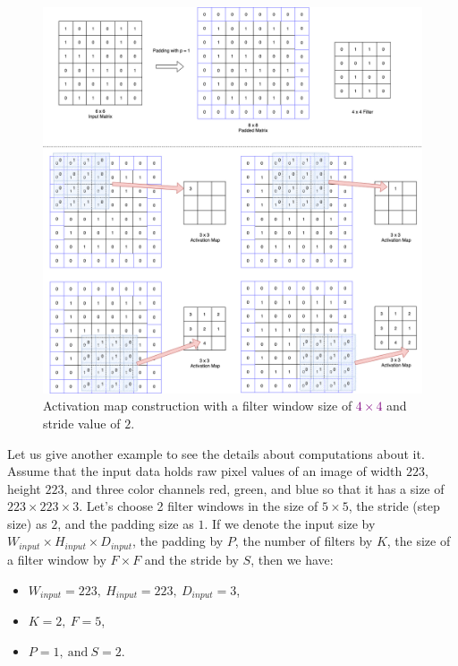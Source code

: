 \begin{figure}[!h]
	\centering
	\includegraphics[width=\linewidth]{fig/conv_layer.png}
	\vspace*{2mm}
	\caption{Activation map construction with a filter window size of  \textcolor{purple}{$4 \times 4$} and stride value of $2$.}
	\label{conv_layer}
\end{figure}

Let us give another example to see the details about computations about it. Assume that the input data 
holds raw pixel values of an image of width $223$, height $223$, and three color channels red, green, and blue so that it has a size of $223 \times 223 \times 3$. Let's choose 2 filter windows in the size of $5 \times 5$, the stride (step size) as $2$, and the padding size as $1$. If we denote the input size by $W_{input} \times H_{input} \times D_{input}$, the padding by $P$, the number of filters by $K$, the size of a filter window by $F \times F$ and the stride by $S$, then we have: 

\begin{itemize}
    \item $W_{input} = 223, \: H_{input} = 223, \: D_{input} = 3$,
    \item $K = 2, \: F = 5$,
    \item $P = 1, \: \text{and} \: S = 2$.
\end{itemize}

